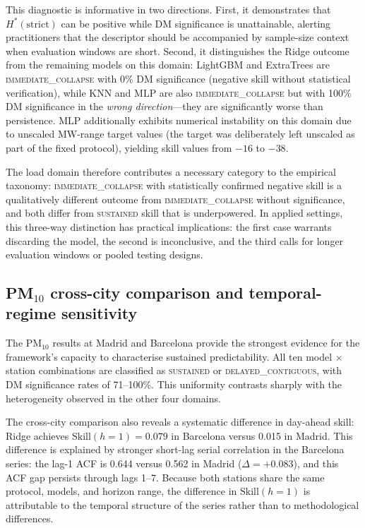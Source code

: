\documentclass[pdflatex,sn-mathphys]{sn-jnl}
\begin{document}
This diagnostic is informative in two directions. First, it demonstrates that $H^*(\mathrm{strict})$ can be positive while DM significance is unattainable, alerting practitioners that the descriptor should be accompanied by sample-size context when evaluation windows are short. Second, it distinguishes the Ridge outcome from the remaining models on this domain: LightGBM and ExtraTrees are \textsc{immediate\_collapse} with 0\% DM significance (negative skill without statistical verification), while KNN and MLP are also \textsc{immediate\_collapse} but with 100\% DM significance in the \emph{wrong direction}—they are significantly worse than persistence. MLP additionally exhibits numerical instability on this domain due to unscaled MW-range target values (the target was deliberately left unscaled as part of the fixed protocol), yielding skill values from $-16$ to $-38$.

The load domain therefore contributes a necessary category to the empirical taxonomy: \textsc{immediate\_collapse} with statistically confirmed negative skill is a qualitatively different outcome from \textsc{immediate\_collapse} without significance, and both differ from \textsc{sustained} skill that is underpowered. In applied settings, this three-way distinction has practical implications: the first case warrants discarding the model, the second is inconclusive, and the third calls for longer evaluation windows or pooled testing designs.

\subsection{PM$_{10}$ cross-city comparison and temporal-regime sensitivity}\label{sec:pm10-discuss}

The PM$_{10}$ results at Madrid and Barcelona provide the strongest evidence for the framework's capacity to characterise sustained predictability. All ten model $\times$ station combinations are classified as \textsc{sustained} or \textsc{delayed\_contiguous}, with DM significance rates of 71--100\%. This uniformity contrasts sharply with the heterogeneity observed in the other four domains.

The cross-city comparison also reveals a systematic difference in day-ahead skill: Ridge achieves $\mathrm{Skill}(h=1)=0.079$ in Barcelona versus 0.015 in Madrid. This difference is explained by stronger short-lag serial correlation in the Barcelona series: the lag-1 ACF is 0.644 versus 0.562 in Madrid ($\Delta=+0.083$), and this ACF gap persists through lags 1--7. Because both stations share the same protocol, models, and horizon range, the difference in $\mathrm{Skill}(h=1)$ is attributable to the temporal structure of the series rather than to methodological differences.
\end{document}
